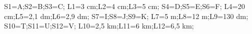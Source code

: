 \documentclass[exercice]{thedocument}%
\begin{document}
%
    \>S1=A;\>S2=B;\>S3=C;%
    \>L1=3 cm;\>L2=4 cm;\>L3=5 cm;%
    \>S4=D;\>S5=E;\>S6=F;%
    \>L4=20 cm;\>L5=2,1 dm;\>L6=2,9 dm;%
    \>S7=I;\>S8=J;\>S9=K;%
    \>L7=5 m;\>L8=12 m;\>L9=130 dm;%
    \>S10=T;\>S11=U;\>S12=V;%
    \>L10=2,5 km;\>L11=6 km;\>L12=6,5 km;%
\end{document}
